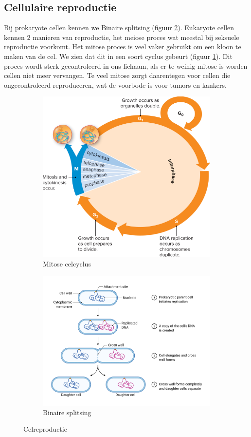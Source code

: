 \documentclass[a4paper,kul]{kulakarticle} %
\begin{document}
\subsection{Cellulaire reproductie}
Bij prokaryote cellen kennen we Binaire splitsing (figuur \ref{fig:binairesplitsing}). Eukaryote cellen kennen 2 manieren van reproductie, het meiose proces wat meestal bij seksuele reproductie voorkomt. Het mitose proces is veel vaker gebruikt om een kloon te maken van de cel. We zien dat dit in een soort cyclus gebeurt (figuur \ref{fig:celcyclus}). Dit proces wordt sterk gecontroleerd in ons lichaam, als er te weinig mitose is worden cellen niet meer vervangen. Te veel mitose zorgt daarentegen voor cellen die ongecontroleerd reproduceren, wat de voorbode is voor tumors en kankers.  

\begin{figure}[h]
	\centering
	\begin{subfigure}{.5\textwidth}
		\centering
		\includegraphics[width=0.7\linewidth]{Celcyclus}
		\caption{Mitose celcyclus}
		\label{fig:celcyclus}
	\end{subfigure}%
	\begin{subfigure}{.5\textwidth}
		\centering
		\includegraphics[width=0.7\linewidth]{Binaire_Splitsing}
		\caption[Splitsing]{Binaire splitsing}
		\label{fig:binairesplitsing}
	\end{subfigure}
	\caption{Celreproductie}
	\label{fig:reproductie}
\end{figure}
\newpage
\end{document}
